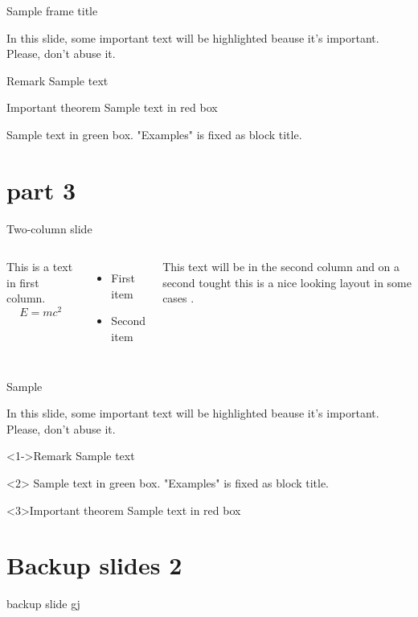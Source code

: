 \documentclass[11pt,aspectratio=1610]{beamer}	%
\begin{document}
\begin{frame}[plain]{Sample frame title}{}
	
	In this slide, some important text will be
	\alert{highlighted} beause it's important.
	Please, don't abuse it.
	
	\begin{block}{Remark}
	Sample text
	\end{block}
	
	\begin{alertblock}{Important theorem}
	Sample text in red box
	\end{alertblock}
	
	\begin{examples}
	Sample text in green box. "Examples" is fixed as block title.
	\end{examples}
\end{frame}

\section{part 3}

\begin{frame}{Two-column slide}{}
	\begin{columns}[t]
		This is a text in first column.
		$$E=mc^2$$
		\begin{itemize}
		\item First item
		\item Second item
		\end{itemize}
		
		This text will be in the second column
		and on a second tought this is a nice looking
		layout in some cases \citep{Venzmer2018}.
	\end{columns}
\end{frame}

\begin{frame}[t]{Sample}{}
	
	In this slide, some important text will be
	\alert<2->{highlighted} beause it's important.
	Please, don't abuse it.
	
	\begin{block}<1->{Remark}
	Sample text
	\end{block}
	
	\begin{examples}
	Sample text in green box. "Examples" is fixed as block title.
	\end{examples}
	
	\begin{alertblock}{Important theorem}
	Sample text in red box
	\end{alertblock}
	
\end{frame}

\section{Backup slides 2}

\begin{frame}{backup slide}{}
	gj
\end{frame}

%
\end{document}
